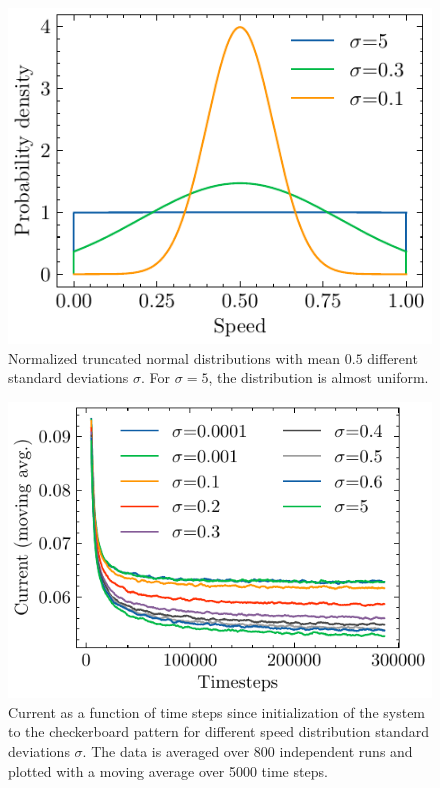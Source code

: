 \begin{figure}
    \centering
    \includegraphics{truncated_normal.pdf}
    \caption{Normalized truncated normal distributions with mean $0.5$ different standard deviations $\sigma$. For $\sigma = 5$, the distribution is almost uniform.}
    \label{fig:speed_dists}
\end{figure}

\begin{figure}
    \centering
    \includegraphics{currents_fixed_sigma.pdf}
    \caption{Current as a function of time steps since initialization of the system to the checkerboard pattern for different speed distribution standard deviations $\sigma$. The data is averaged over 800 independent runs and plotted with a moving average over 5000 time steps.}
    \label{fig:currents_fixed_sigma_128x32}
\end{figure}

